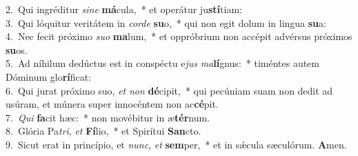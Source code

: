 {2.~}Qui ingréditur \textit{si}\textit{ne} \textbf{má}cula,~* et operátur ju\textbf{stí}tiam:\\
{3.~}Qui lóquitur veritátem in \textit{cor}\textit{de} \textbf{su}o,~* qui non egit dolum in lingua \textbf{su}a:\\
{4.~}Nec fecit próximo \textit{su}\textit{o} \textbf{ma}lum,~* et oppróbrium non accépit advérsus próximos \textbf{su}os.\\
{5.~}Ad níhilum dedúctus est in conspéctu e\textit{jus} \textit{ma}\textbf{lí}gnus:~* timéntes autem Dóminum glo\textbf{rí}ficat:\\
{6.~}Qui jurat próximo suo, \textit{et} \textit{non} \textbf{dé}cipit,~* qui pecúniam suam non dedit ad usúram, et múnera super innocéntem non ac\textbf{cé}pit.\\
{7.~}\textit{Qui} \textbf{fa}cit hæc:~* non movébitur in æ\textbf{tér}num.\\
{8.~}Glória Pa\textit{tri}, \textit{et} \textbf{Fí}lio,~* et Spirítui \textbf{San}cto.\\
{9.~}Sicut erat in princípio, et \textit{nunc}, \textit{et} \textbf{sem}per,~* et in sǽcula sæculórum. \textbf{A}men.\\
